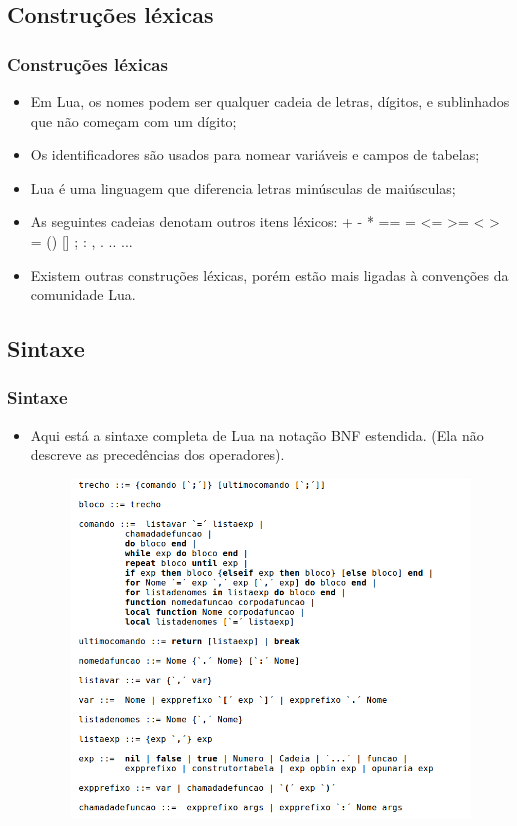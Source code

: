 \documentclass{beamer}
\begin{document}
\subsection{Construções léxicas}
\begin{frame}[fragile]
\frametitle{Construções léxicas}
	\begin{itemize}
	\item Em Lua, os nomes podem ser qualquer cadeia de letras, dígitos, e sublinhados que não começam com um dígito; 
	\item Os identificadores são usados para nomear variáveis e campos de tabelas;
	\item Lua é uma linguagem que diferencia letras minúsculas de maiúsculas;
	\item As seguintes cadeias denotam outros itens léxicos: + - * == = <= >= < > = () [] ; : , . .. ...
	\item Existem outras construções léxicas, porém estão mais ligadas à convenções da comunidade Lua.
	\end{itemize}
\end{frame}

\subsection{Sintaxe}
\begin{frame}[fragile]
\frametitle{Sintaxe}
	\begin{itemize}
	\item Aqui está a sintaxe completa de Lua na notação BNF estendida. (Ela não descreve as precedências dos operadores). 
	\begin{figure}[!htb]
		\centering
		\includegraphics[width=0.9\linewidth]{imagens/sintaxe1}
	\end{figure}
	\end{itemize}
\end{frame}
\end{document}
